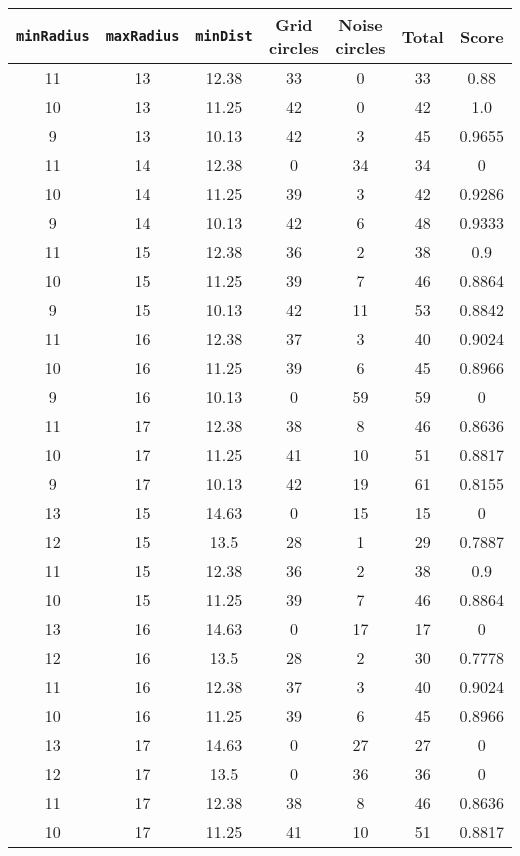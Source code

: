 \documentclass[letterpaper, 12pt]{article}
\begin{document}
\begin{longtable}{|c|c|c|c|c|c|c|}
\hline
\textbf{\texttt{minRadius}} & \textbf{\texttt{maxRadius}} & \textbf{\texttt{minDist}} & \textbf{Grid circles} & \textbf{Noise circles} & \textbf{Total} & \textbf{Score} \\
\hline
11 & 13 & 12.38 & 33 & 0 & 33 & 0.88 \\
\hline
10 & 13 & 11.25 & 42 & 0 & 42 & 1.0 \\
\hline
9 & 13 & 10.13 & 42 & 3 & 45 & 0.9655 \\
\hline
11 & 14 & 12.38 & 0 & 34 & 34 & 0 \\
\hline
10 & 14 & 11.25 & 39 & 3 & 42 & 0.9286 \\
\hline
9 & 14 & 10.13 & 42 & 6 & 48 & 0.9333 \\
\hline
11 & 15 & 12.38 & 36 & 2 & 38 & 0.9 \\
\hline
10 & 15 & 11.25 & 39 & 7 & 46 & 0.8864 \\
\hline
9 & 15 & 10.13 & 42 & 11 & 53 & 0.8842 \\
\hline
11 & 16 & 12.38 & 37 & 3 & 40 & 0.9024 \\
\hline
10 & 16 & 11.25 & 39 & 6 & 45 & 0.8966 \\
\hline
9 & 16 & 10.13 & 0 & 59 & 59 & 0 \\
\hline
11 & 17 & 12.38 & 38 & 8 & 46 & 0.8636 \\
\hline
10 & 17 & 11.25 & 41 & 10 & 51 & 0.8817 \\
\hline
9 & 17 & 10.13 & 42 & 19 & 61 & 0.8155 \\
\hline
13 & 15 & 14.63 & 0 & 15 & 15 & 0 \\
\hline
12 & 15 & 13.5 & 28 & 1 & 29 & 0.7887 \\
\hline
11 & 15 & 12.38 & 36 & 2 & 38 & 0.9 \\
\hline
10 & 15 & 11.25 & 39 & 7 & 46 & 0.8864 \\
\hline
13 & 16 & 14.63 & 0 & 17 & 17 & 0 \\
\hline
12 & 16 & 13.5 & 28 & 2 & 30 & 0.7778 \\
\hline
11 & 16 & 12.38 & 37 & 3 & 40 & 0.9024 \\
\hline
10 & 16 & 11.25 & 39 & 6 & 45 & 0.8966 \\
\hline
13 & 17 & 14.63 & 0 & 27 & 27 & 0 \\
\hline
12 & 17 & 13.5 & 0 & 36 & 36 & 0 \\
\hline
11 & 17 & 12.38 & 38 & 8 & 46 & 0.8636 \\
\hline
10 & 17 & 11.25 & 41 & 10 & 51 & 0.8817 \\

\end{longtable}
\end{document}
